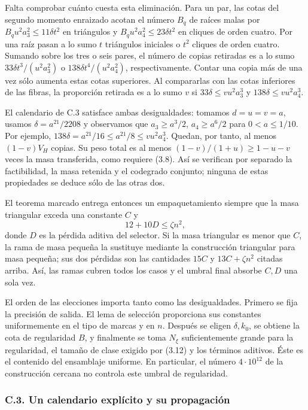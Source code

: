 \documentclass[spanish,11pt,a4paper]{article}
\begin{document}
Falta comprobar cuánto cuesta esta eliminación. Para un par, las cotas del segundo momento enraizado acotan el número \(B_q\) de raíces malas por \(B_qu^2a_3^2\le11\delta t^2\) en triángulos y \(B_qu^2a_4^2\le23\delta t^2\) en cliques de orden cuatro. Por una raíz pasan a lo sumo \(t\) triángulos iniciales o \(t^2\) cliques de orden cuatro. Sumando sobre los tres o seis pares, el número de copias retiradas es a lo sumo \(33\delta t^3/(u^2a_3^2)\) o \(138\delta t^4/(u^2a_4^2)\), respectivamente. Contar una copia más de una vez sólo aumenta estas cotas superiores. Al compararlas con las cotas inferiores de las fibras, la proporción retirada es a lo sumo \(v\) si \(33\delta\le vu^2a_3^3\) y \(138\delta\le vu^2a_4^3\).

El calendario de C.3 satisface ambas desigualdades: tomamos \(d=u=v=a\), usamos \(\delta=a^{21}/2208\) y observamos que \(a_3\ge a^3/2\), \(a_4\ge a^6/2\) para \(0<a\le1/10\). Por ejemplo, \(138\delta=a^{21}/16\le a^{21}/8\le vu^2a_4^3\). Quedan, por tanto, al menos \((1-v)V_H\) copias. Su peso total es al menos \((1-v)/(1+u)\ge1-u-v\) veces la masa transferida, como requiere (3.8). Así se verifican por separado la factibilidad, la masa retenida y el codegrado conjunto; ninguna de estas propiedades se deduce sólo de las otras dos.

El teorema marcado entrega entonces un empaquetamiento siempre que la masa triangular exceda una constante \(C\) y \[
12+10D\le\zeta n^2,
\tag{3.14}
\] donde \(D\) es la pérdida aditiva del selector. Si la masa triangular es menor que \(C\), la rama de masa pequeña la sustituye mediante la construcción triangular para masa pequeña; sus dos pérdidas son las cantidades \(15C\) y \(13C+\zeta n^2\) citadas arriba. Así, las ramas cubren todos los casos y el umbral final absorbe \(C,D\) una sola vez.

El orden de las elecciones importa tanto como las desigualdades. Primero se fija la precisión de salida. El lema de selección proporciona sus constantes uniformemente en el tipo de marcas y en \(n\). Después se eligen \(\delta,k_0\), se obtiene la cota de regularidad \(B\), y finalmente se toma \(N_\xi\) suficientemente grande para la regularidad, el tamaño de clase exigido por (3.12) y los términos aditivos. Éste es el contenido del ensamblaje uniforme. En particular, el número \(4\cdot10^{12}\) de la construcción cercana no controla este umbral de regularidad.

\subsubsection{C.3. Un calendario explícito y su propagación}\label{c.3.-un-calendario-explicito-y-su-propagacion}
\end{document}
